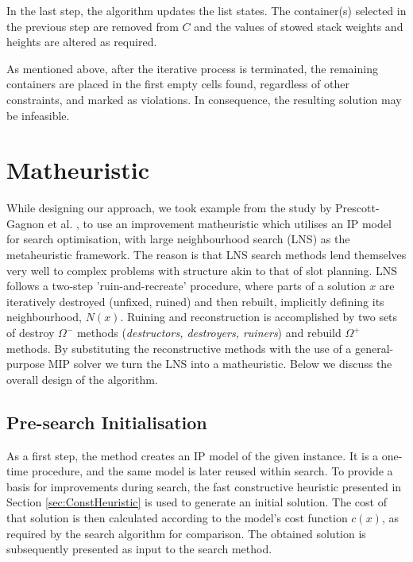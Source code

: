 \documentclass[preprint,12pt,3p]{elsarticle}
\begin{document}
In the last step, the algorithm updates the list states. The container(s) selected in the previous step are removed from $C$  and the values of stowed stack weights and heights are altered as required. \cite{PPAV16}

As mentioned above, after the iterative process is terminated, the remaining containers are placed in the first empty cells found, regardless of other constraints, and marked as violations. In consequence, the resulting solution may be infeasible.

\section{Matheuristic}
\label{sec:Matheuristic}
While designing our approach, we took example from the study by Prescott-Gagnon et al. \cite{PGDR-Math}, to use an improvement matheuristic which utilises an IP model for search optimisation, with large neighbourhood search (LNS) \cite{PR-LNS} as the metaheuristic framework. The reason is that LNS search methods lend themselves very well to complex problems with structure akin to that of slot planning. LNS follows a two-step 'ruin-and-recreate' procedure, where parts of a solution $x$ are iteratively destroyed (unfixed, ruined) and then rebuilt, implicitly defining its neighbourhood, $N(x)$. Ruining and reconstruction is accomplished by two sets of destroy $\Omega^{-}$ methods (\textit{destructors, destroyers, ruiners}) and rebuild $\Omega^{+}$ methods. By substituting the reconstructive methods with the use of a general-purpose MIP solver we turn the LNS into a matheuristic. Below we discuss the overall design of the algorithm.

\subsection{Pre-search Initialisation}
As a first step, the method creates an IP model of the given instance. It is a one-time procedure, and the same model is later reused within search. To provide a basis for improvements during search, the fast constructive heuristic presented in Section \ref{sec:ConstHeuristic} is used to generate an initial solution. The cost of that solution is then calculated according to the model's cost function $c(x)$, as required by the search algorithm for comparison. The obtained solution is subsequently presented as input to the search method. 
\end{document}
